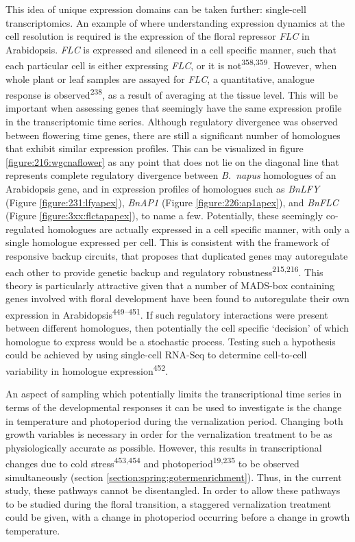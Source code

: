 \documentclass[12pt,]{book}
\begin{document}
This idea of unique expression domains can be taken further: single-cell
transcriptomics. An example of where understanding expression dynamics
at the cell resolution is required is the expression of the floral
repressor \emph{FLC} in Arabidopsis. \emph{FLC} is expressed and
silenced in a cell specific manner, such that each particular cell is
either expressing \emph{FLC}, or it is not\textsuperscript{358,359}.
However, when whole plant or leaf samples are assayed for \emph{FLC}, a
quantitative, analogue response is observed\textsuperscript{238}, as a
result of averaging at the tissue level. This will be important when
assessing genes that seemingly have the same expression profile in the
transcriptomic time series. Although regulatory divergence was observed
between flowering time genes, there are still a significant number of
homologues that exhibit similar expression profiles. This can be
visualized in figure \ref{figure:216:wgcnaflower} as any point that does
not lie on the diagonal line that represents complete regulatory
divergence between \emph{B.~napus} homologues of an Arabidopsis gene,
and in expression profiles of homologues such as \emph{BnLFY} (Figure
\ref{figure:231:lfyapex}), \emph{BnAP1} (Figure
\ref{figure:226:ap1apex}), and \emph{BnFLC} (Figure
\ref{figure:3xx:flctapapex}), to name a few. Potentially, these
seemingly co-regulated homologues are actually expressed in a cell
specific manner, with only a single homologue expressed per cell. This
is consistent with the framework of responsive backup circuits, that
proposes that duplicated genes may autoregulate each other to provide
genetic backup and regulatory robustness\textsuperscript{215,216}. This
theory is particularly attractive given that a number of MADS-box
containing genes involved with floral development have been found to
autoregulate their own expression in
Arabidopsis\textsuperscript{449--451}. If such regulatory interactions
were present between different homologues, then potentially the cell
specific `decision' of which homologue to express would be a stochastic
process. Testing such a hypothesis could be achieved by using
single-cell RNA-Seq to determine cell-to-cell variability in homologue
expression\textsuperscript{452}.

An aspect of sampling which potentially limits the transcriptional time
series in terms of the developmental responses it can be used to
investigate is the change in temperature and photoperiod during the
vernalization period. Changing both growth variables is necessary in
order for the vernalization treatment to be as physiologically accurate
as possible. However, this results in transcriptional changes due to
cold stress\textsuperscript{453,454} and
photoperiod\textsuperscript{19,235} to be observed simultaneously
(section \ref{section:spring:gotermenrichment}). Thus, in the current
study, these pathways cannot be disentangled. In order to allow these
pathways to be studied during the floral transition, a staggered
vernalization treatment could be given, with a change in photoperiod
occurring before a change in growth temperature.
\end{document}
